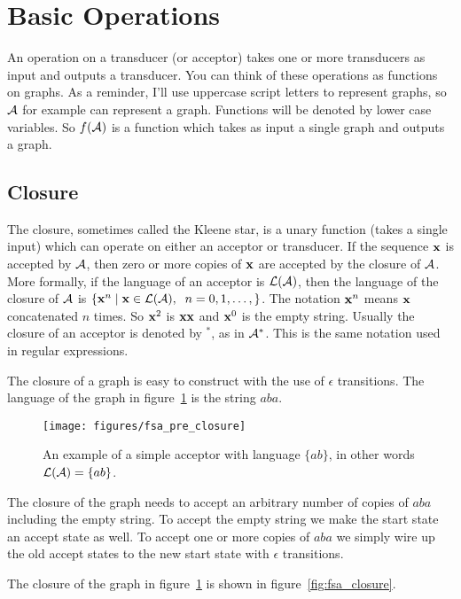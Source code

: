 \documentclass[main.tex]{subfiles}
\begin{document}
\section{Basic Operations}
\label{sec:basic_operations}

An operation on a transducer (or acceptor) takes one or more transducers as
input and outputs a transducer. You can think of these operations as functions
on graphs. As a reminder, I'll use uppercase script letters to represent
graphs, so $\mathcal{A}$ for example can represent a graph. Functions will be denoted
by lower case variables. So $f(\mathcal{A})$ is a function which takes as input a
single graph and outputs a graph.

\subsection{Closure}

The closure, sometimes called the Kleene star, is a unary function (takes a
single input) which can operate on either an acceptor or transducer. If the
sequence ${\bf x}$ is accepted by $\mathcal{A}$, then zero or more copies of ${\bf x}$ are
accepted by the closure of $\mathcal{A}$. More formally, if the language of an acceptor
is $\mathcal{L}(\mathcal{A})$, then the language of the closure of $\mathcal{A}$ is $\{{\bf x}^n
\mid {\bf x} \in \mathcal{L}(\mathcal{A}),\;\; n = 0, 1, \ldots, \}$. The notation ${\bf x}^n$
means ${\bf x}$ concatenated $n$ times. So ${\bf x}^2$ is ${\bf x} {\bf x}$ and ${\bf x}^0$ is the
empty string. Usually the closure of an acceptor is denoted by $^*$, as in
$\mathcal{A}^*$. This is the same notation used in regular expressions.

The closure of a graph is easy to construct with the use of $\epsilon$
transitions. The language of the graph in figure~\ref{fig:fsa_pre_closure} is
the string $aba$.

\begin{figure}
    \centering
    \texttt{[image: figures/fsa\_pre\_closure]}
    \caption{An example of a simple acceptor with language $\{ab\}$, in other
    words $\mathcal{L}(\mathcal{A}) = \{ab\}$.}
    \label{fig:fsa_pre_closure}
\end{figure}

The closure of the graph needs to accept an arbitrary number of copies of $aba$
including the empty string. To accept the empty string we make the start state
an accept state as well. To accept one or more copies of $aba$ we simply wire
up the old accept states to the new start state with $\epsilon$ transitions.

The closure of the graph in figure~\ref{fig:fsa_pre_closure} is shown in
figure~\ref{fig:fsa_closure}.
\end{document}
